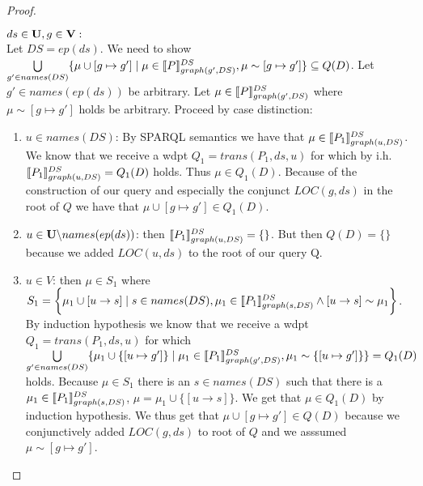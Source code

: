 \begin{proof}
\begin{enumerate}
			\bigskip\noindent
			$ds \in \mathbf{U}, g \in \mathbf{V}:$ \\ Let $DS = ep(ds)$.
			We need to show\\
			$\bigcup\limits_{g' \in names(DS)} \{ \mu \cup [g\mapsto g'] \mid \mu \in
				\llbracket P \rrbracket^{DS}_{graph(g',DS)}, \mu \sim
			[g\mapsto g'] \}  \subseteq Q(D) $.
			Let  $g' \in names(ep(ds))$ be arbitrary.
			Let $\mu \in \llbracket P \rrbracket^{DS}_{graph(g',DS)}$ where $\mu \sim [g
			\mapsto g']$ holds be arbitrary.
			Proceed by case distinction:
			\begin{enumerate}
				\item $u \in names(DS)$:
					By SPARQL semantics we have that $\mu \in \llbracket P_1
					\rrbracket^{DS}_{graph(u,DS)}$.
					We know that we receive a wdpt $Q_1	= trans(P_1,ds,u)$ 
					for which by i.h.
					$\llbracket P_1 \rrbracket^{DS}_{graph(u,DS)} = Q_1(D)$ holds. Thus $\mu
					\in Q_1(D)$.
					Because of the construction of our query and especially the
					conjunct $LOC(g,ds)$ in the root of $Q$ we have that 
					$\mu \cup [g\mapsto g'] \in Q_1(D)$.

				\item $u \in \mathbf{U} \backslash names(ep(ds))$:
					then $\llbracket P_1 \rrbracket^{DS}_{graph(u,DS)} = \{\}$. But then
					$Q(D) = \{\}$ because we added $LOC(u,ds)$ to the root of
					our query Q.
				\item $u \in V$:
					then $\mu \in S_1$ where $S_1 =  \bigg\{\mu_1 \cup [ u \rightarrow s ] \mid
						s \in names(DS), \mu_1 \in \llbracket P_1
						\rrbracket^{DS}_{graph(s,DS)} \land [ u \rightarrow s ] \sim
					\mu_1 \bigg\}$. 
					By induction hypothesis we know that we receive a wdpt $Q_1
					= trans(P_1,ds,u)$ for which\\ $\bigcup\limits_{g'\in names(DS)} 
					\{ \mu_1 \cup \{[u\mapsto g']\} \mid 
						\mu_1 \in \llbracket P_1 \rrbracket^{DS}_{graph(g',DS)}, 
					\mu_1 \sim \{[u \mapsto g']\}\} = Q_1(D)$ holds. Because $\mu \in S_1$ there
					is an $s \in names(DS)$ such  that there is a $\mu_1 \in \llbracket P_1
					\rrbracket^{DS}_{graph(s,DS)}$, 
					$\mu = \mu_1 \cup \{[u \rightarrow s]\}$. 
					We get that $\mu \in Q_1(D)$ by induction hypothesis. 
					We thus get that $\mu\cup[g\mapsto g'] \in Q(D)$ because we
					conjunctively added $LOC(g,ds)$ to root of $Q$ and we
					asssumed $\mu \sim [g\mapsto g']$.
			\end{enumerate}


\end{enumerate}
\end{proof}

